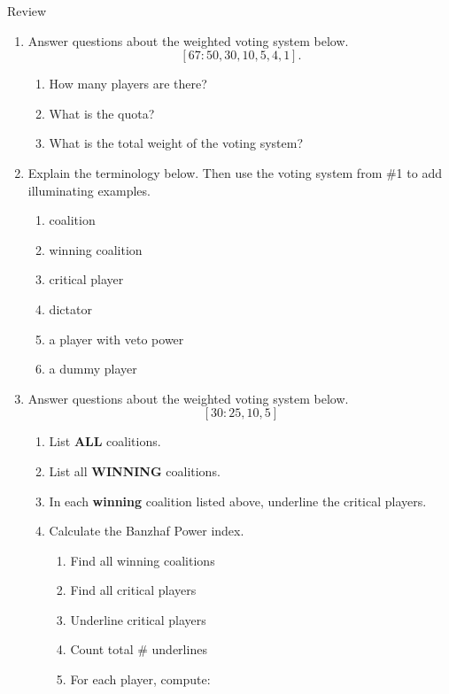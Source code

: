 \documentclass[12pt]{article}
\renewcommand{\emph}[1]{\textsf{\textbf{#1}}}
\begin{document}
\begin{center} Review \end{center}
\begin{enumerate}
\item Answer questions about the weighted voting system below.
$$[67: 50,30,10,5,4,1].$$
	\begin{enumerate}
	\item How many players are there? \underline{\hspace{.5in}}\\
	\item What is the quota? \underline{\hspace{.5in}}\\
	\item What is the total weight of the voting system? \underline{\hspace{.5in}}\\
	\end{enumerate}
\item Explain the terminology below. Then use the voting system from \#1 to add illuminating examples.
	\begin{enumerate}
	\item coalition
	\vfill
	\item winning coalition
	\vfill
	\item critical player
	\vfill
	\item dictator
	\vfill
	\item a player with veto power
	\vfill
	\item a dummy player
	\vfill
	\end{enumerate}
\newpage
\item Answer questions about the weighted voting system below.
$$[30: 25, 10, 5]$$
	\begin{enumerate}
	\item List \emph{ALL} coalitions.
	\vfill
	\item List all \emph{WINNING} coalitions.
	\vfill
	\item In each \emph{winning} coalition listed above, underline the critical players.\\	
	\item Calculate the Banzhaf Power index.
\begin{enumerate}
\item Find all winning coalitions
\item Find all critical players
\item Underline critical players
\item Count total \# underlines
\item For each player, compute:
\end{enumerate}

	
	\vspace{3in}
	\end{enumerate}
	

\end{enumerate}
\end{document}
